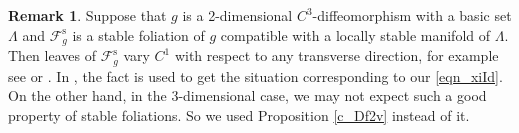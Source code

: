 \documentclass{amsart}
\theoremstyle{definition}
\newtheorem{rmk}[thm]{Remark}
\numberwithin{equation}{section}
\numberwithin{figure}{section}
\begin{document}
\begin{rmk}\label{r_Df2v}
Suppose that $g$ is a 2-dimensional $C^3$-diffeomorphism with a basic set $\Lambda$ and $\mathcal{F}_g^{\mathrm{s}}$ is 
a stable foliation of $g$ compatible with a locally stable manifold of $\Lambda$.
Then leaves of $\mathcal{F}_g^{\mathrm{s}}$ vary $C^1$ with respect to any transverse direction, for example 
see \cite[Appendix 1, Theorem 8]{PT93} or \cite[Lemma 4.1]{KKY92}.
In \cite{KS17}, the fact is used to get the situation corresponding to our \eqref{eqn_xiId}.
On the other hand, in the 3-dimensional case, we may not expect such a good property of stable foliations.
So we used Proposition \ref{c_Df2v} instead of it.
\end{rmk}
\end{document}
